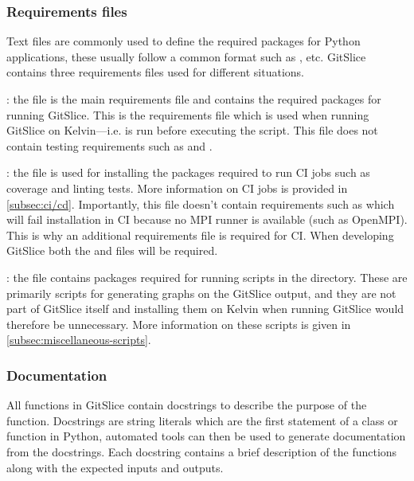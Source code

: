 \documentclass[11pt]{article}
\begin{document}
    \subsubsection{Requirements files}
    \label{subsubsec:requirements-files}

    Text files are commonly used to define the required packages for Python applications, these usually follow a common format such as ,  etc.
    GitSlice contains three requirements files used for different situations.
    
    : the  file is the main requirements file and contains the required packages for running GitSlice.
    This is the requirements file which is used when running GitSlice on Kelvin---i.e.  is run before executing the  script.
    This file does not contain testing requirements such as  and .
    
    : the  file is used for installing the packages required to run CI jobs such as coverage and linting tests.
    More information on CI jobs is provided in \autoref{subsec:ci/cd}.
    Importantly, this file doesn't contain requirements such as  which will fail installation in CI because no MPI runner is available (such as OpenMPI).
    This is why an additional requirements file is required for CI\@.
    When developing GitSlice both the  and  files will be required.
    
    : the  file contains packages required for running scripts in the  directory.
    These are primarily scripts for generating graphs on the GitSlice output, and they are not part of GitSlice itself and installing them on Kelvin when running GitSlice would therefore be unnecessary.
    More information on these scripts is given in \autoref{subsec:miscellaneous-scripts}.

    \subsubsection{Documentation}
    \label{subsubsec:documentation}

    All functions in GitSlice contain docstrings to describe the purpose of the function.
    Docstrings are string literals which are the first statement of a class or function in Python, automated tools can then be used to generate documentation from the docstrings.
    Each docstring contains a brief description of the functions along with the expected inputs and outputs.
\end{document}
